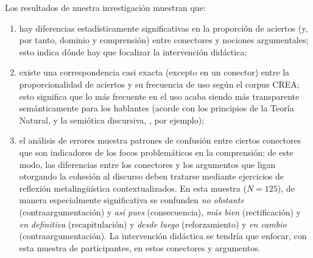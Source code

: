 \documentclass[spanish]{textolivre}
\begin{document}
Los resultados de nuestra investigación muestran que:

\begin{enumerate}
    \item hay diferencias estadísticamente significativas en la proporción de aciertos (y, por tanto, dominio y comprensión) entre conectores y nociones argumentales; esto indica dónde hay que focalizar la intervención didáctica;
    \item existe una correspondencia casi exacta (excepto en un conector) entre la proporcionalidad de aciertos y su frecuencia de uso según el corpus CREA; esto significa que lo más frecuente en el uso acaba siendo más transparente semánticamente para los hablantes (acorde con los principios de la Teoría Natural, \textcite{dressler_morphonology_1985} y la semiótica discursiva, \textcite{kress2000semiotica}, por ejemplo);
    \item el análisis de errores muestra patrones de confusión entre ciertos conectores que son indicadores de los focos problemáticos en la comprensión; de este modo, las diferencias entre los conectores y los argumentos que ligan otorgando la cohesión al discurso deben tratarse mediante ejercicios de reflexión metalingüística contextualizados. En esta muestra ($N=125$), de manera especialmente significativa se confunden \emph{no obstante} (contraargumentación) y \emph{así pues} (consecuencia), \emph{más bien} (rectificación) y \emph{en definitiva} (recapitulación) y \emph{desde luego} (reforzamiento) y \emph{en cambio} (contraargumentación). La intervención didáctica se tendría que enfocar, con esta muestra de participantes, en estos conectores y argumentos.
\end{enumerate}
\end{document}
